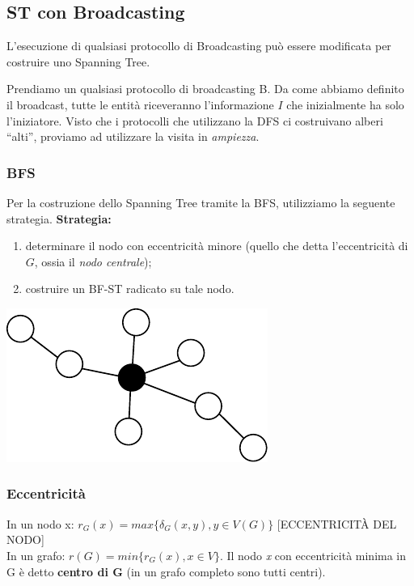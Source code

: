 \subsection{ST con Broadcasting}

\begin{theorem}
    L'esecuzione di qualsiasi protocollo di Broadcasting può essere modificata
    per costruire uno Spanning Tree.
\end{theorem}

Prendiamo un qualsiasi protocollo di broadcasting B. Da come abbiamo definito il
broadcast, tutte le entità riceveranno l'informazione $I$ che inizialmente ha
solo l'iniziatore.
Visto che i protocolli che utilizzano la DFS ci costruivano alberi ``alti'',
proviamo ad utilizzare la visita in \textit{ampiezza}.

\subsubsection{BFS}
Per la costruzione dello Spanning Tree tramite la BFS, utilizziamo la seguente
strategia.
\textbf{Strategia:}
\begin{enumerate}
    \item determinare il nodo con eccentricità minore (quello che detta
          l'eccentricità di $G$, ossia il \textit{nodo centrale});
    \item costruire un BF-ST radicato su tale nodo.
\end{enumerate}

\begin{center}
    \includegraphics[scale=1]{capitoli/costruzione-spanning-tree/imgs/n_24}
\end{center}

\subsubsection{Eccentricità}
In un nodo x: $r_G(x) = max\{ \delta_G(x,y), y \in V(G) \}$ [ECCENTRICITÀ
        DEL NODO]\\
In un grafo: $r(G) = min \{ r_G(x), x \in V \}$. Il nodo \emph{x} con
eccentricità minima in G è detto \textbf{centro di G} (in un grafo completo sono
tutti centri).\\


